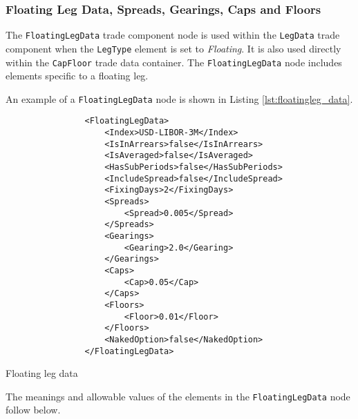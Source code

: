 \subsubsection{Floating Leg Data, Spreads, Gearings, Caps and Floors}
\label{ss:floatingleg_data}

The \lstinline!FloatingLegData! trade component node is used within the \lstinline!LegData! trade component when the
\lstinline!LegType! element is set to \emph{Floating}. It is also used directly within the \lstinline!CapFloor! trade
data container.  The \lstinline!FloatingLegData! node includes elements specific to a floating leg.

An example of a \lstinline!FloatingLegData! node is shown in Listing \ref{lst:floatingleg_data}.
\begin{listing}[H]
\begin{verbatim}
                <FloatingLegData>
                    <Index>USD-LIBOR-3M</Index>
                    <IsInArrears>false</IsInArrears>
                    <IsAveraged>false</IsAveraged>
                    <HasSubPeriods>false</HasSubPeriods>
                    <IncludeSpread>false</IncludeSpread>
                    <FixingDays>2</FixingDays>
                    <Spreads>
                        <Spread>0.005</Spread>
                    </Spreads>
                    <Gearings>
                        <Gearing>2.0</Gearing>
                    </Gearings>
                    <Caps>
                        <Cap>0.05</Cap>
                    </Caps>
                    <Floors>
                        <Floor>0.01</Floor>
                    </Floors>
                    <NakedOption>false</NakedOption>    
                </FloatingLegData>
\end{verbatim}
\caption{Floating leg data}
\label{lst:floatingleg_data}
\end{listing}

The meanings and allowable values of the elements in the \lstinline!FloatingLegData! node follow below.

